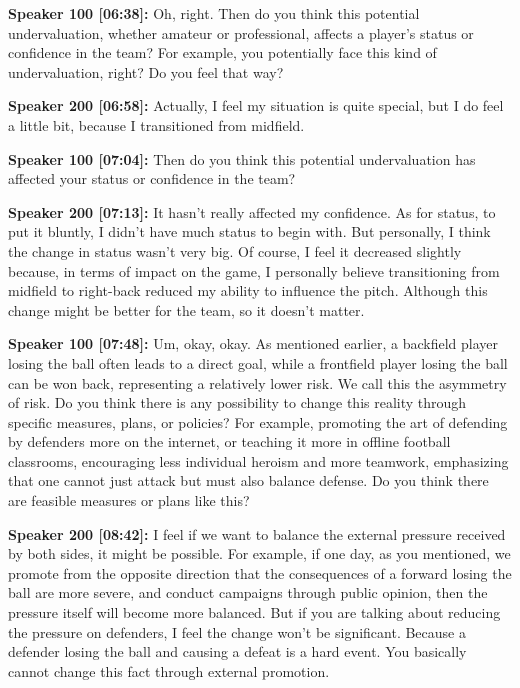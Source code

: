 \documentclass[11pt,a4paper]{article}
\begin{document}
\begin{linenumbers}
\vspace{0.5em}
\noindent \textbf{Speaker 100 [06:38]:} Oh, right. Then do you think this potential undervaluation, whether amateur or professional, affects a player's status or confidence in the team? For example, you potentially face this kind of undervaluation, right? Do you feel that way? 

\vspace{0.5em}
\noindent \textbf{Speaker 200 [06:58]:} Actually, I feel my situation is quite special, but I do feel a little bit, because I transitioned from midfield. 

\vspace{0.5em}
\noindent \textbf{Speaker 100 [07:04]:} Then do you think this potential undervaluation has affected your status or confidence in the team? 

\vspace{0.5em}
\noindent \textbf{Speaker 200 [07:13]:} It hasn't really affected my confidence. As for status, to put it bluntly, I didn't have much status to begin with. But personally, I think the change in status wasn't very big. Of course, I feel it decreased slightly because, in terms of impact on the game, I personally believe transitioning from midfield to right-back reduced my ability to influence the pitch. Although this change might be better for the team, so it doesn't matter. 

\vspace{0.5em}
\noindent \textbf{Speaker 100 [07:48]:} Um, okay, okay. As mentioned earlier, a backfield player losing the ball often leads to a direct goal, while a frontfield player losing the ball can be won back, representing a relatively lower risk. We call this the asymmetry of risk. Do you think there is any possibility to change this reality through specific measures, plans, or policies? For example, promoting the art of defending by defenders more on the internet, or teaching it more in offline football classrooms, encouraging less individual heroism and more teamwork, emphasizing that one cannot just attack but must also balance defense. Do you think there are feasible measures or plans like this? 

\vspace{0.5em}
\noindent \textbf{Speaker 200 [08:42]:} I feel if we want to balance the external pressure received by both sides, it might be possible. For example, if one day, as you mentioned, we promote from the opposite direction that the consequences of a forward losing the ball are more severe, and conduct campaigns through public opinion, then the pressure itself will become more balanced. But if you are talking about reducing the pressure on defenders, I feel the change won't be significant. Because a defender losing the ball and causing a defeat is a hard event. You basically cannot change this fact through external promotion. 


\end{linenumbers}
\end{document}

